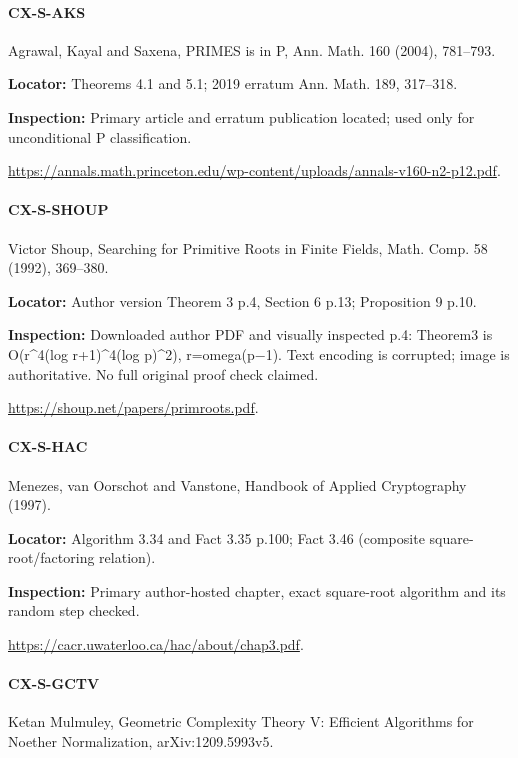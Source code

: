 \documentclass[11pt,a4paper]{article}
\begin{document}
\paragraph{CX-S-AKS} Agrawal, Kayal and Saxena, PRIMES is in P, Ann.\allowbreak{} Math.\allowbreak{} 160 (2004), 781–\allowbreak{}793.

\textbf{Locator:} Theorems 4.\allowbreak{}1 and 5.\allowbreak{}1; 2019 erratum Ann.\allowbreak{} Math.\allowbreak{} 189, 317–\allowbreak{}318.

\textbf{Inspection:} Primary article and erratum publication located; used only for unconditional P classification.\allowbreak{}

\url{https://annals.math.princeton.edu/wp-content/uploads/annals-v160-n2-p12.pdf}.

\paragraph{CX-S-SHOUP} Victor Shoup, Searching for Primitive Roots in Finite Fields, Math.\allowbreak{} Comp.\allowbreak{} 58 (1992), 369–\allowbreak{}380.

\textbf{Locator:} Author version Theorem 3 p.\allowbreak{}4, Section 6 p.\allowbreak{}13; Proposition 9 p.\allowbreak{}10.

\textbf{Inspection:} Downloaded author PDF and visually inspected p.\allowbreak{}4:\allowbreak{} Theorem3 is O(r\textasciicircum{}4(log r+1)\textasciicircum{}4(log p)\textasciicircum{}2), r=omega(p\ensuremath{-}1).\allowbreak{} Text encoding is corrupted; image is authoritative.\allowbreak{} No full original proof check claimed.\allowbreak{}

\url{https://shoup.net/papers/primroots.pdf}.

\paragraph{CX-S-HAC} Menezes, van Oorschot and Vanstone, Handbook of Applied Cryptography (1997).

\textbf{Locator:} Algorithm 3.\allowbreak{}34 and Fact 3.\allowbreak{}35 p.\allowbreak{}100; Fact 3.\allowbreak{}46 (composite square-root/\allowbreak{}factoring relation).

\textbf{Inspection:} Primary author-hosted chapter, exact square-root algorithm and its random step checked.\allowbreak{}

\url{https://cacr.uwaterloo.ca/hac/about/chap3.pdf}.

\paragraph{CX-S-GCTV} Ketan Mulmuley, Geometric Complexity Theory V:\allowbreak{} Efficient Algorithms for Noether Normalization, arXiv:\allowbreak{}1209.\allowbreak{}5993v5.
\end{document}
